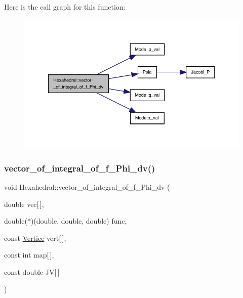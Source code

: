 Here is the call graph for this function\+:
\nopagebreak
\begin{figure}[H]
\begin{center}
\leavevmode
\includegraphics[width=350pt]{classHexahedral_a22d3f788ce0bdf8209c800282868b8c1_cgraph}
\end{center}
\end{figure}
\mbox{\label{classHexahedral_acbbaec7da99759f1d6df6587a9825c22}} 
\subsubsection{\texorpdfstring{vector\+\_\+of\+\_\+integral\+\_\+of\+\_\+f\+\_\+\+Phi\+\_\+dv()}{vector\_of\_integral\_of\_f\_Phi\_dv()}\hspace{0.1cm}{\footnotesize\ttfamily [2/2]}}
{\footnotesize\ttfamily void Hexahedral\+::vector\+\_\+of\+\_\+integral\+\_\+of\+\_\+f\+\_\+\+Phi\+\_\+dv (\begin{DoxyParamCaption}\item[{double}]{vec\mbox{[}$\,$\mbox{]},  }\item[{double($\ast$)(double, double, double)}]{func,  }\item[{const \hyperlink{structVertice}{Vertice}}]{vert\mbox{[}$\,$\mbox{]},  }\item[{const int}]{map\mbox{[}$\,$\mbox{]},  }\item[{const double}]{JV\mbox{[}$\,$\mbox{]} }\end{DoxyParamCaption})\hspace{0.3cm}{\ttfamily [virtual]}}



